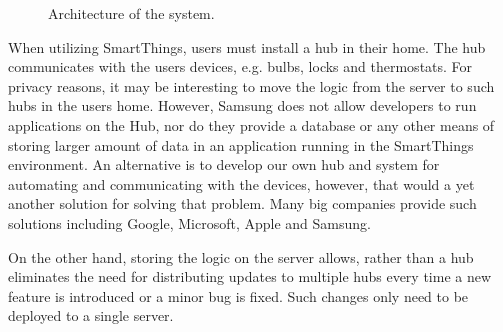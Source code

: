 \begin{figure}[h]
  \centering
  \caption{Architecture of the system.}
  \label{fig:architecture}
\end{figure}

When utilizing SmartThings, users must install a hub in their home. 
The hub communicates with the users devices, e.g. bulbs, locks and thermostats. 
For privacy reasons, it may be interesting to move the logic from the server to such hubs in the users home. 
However, Samsung does not allow developers to run applications on the Hub, 
nor do they provide a database or any other means of storing larger amount of data in an application running in the SmartThings environment.
An alternative is to develop our own hub and system for automating and communicating with the devices, 
however, that would a yet another solution for solving that problem. 
Many big companies provide such solutions including Google, Microsoft, Apple and Samsung.

On the other hand, storing the logic on the server allows, 
rather than a hub eliminates the need for distributing updates to multiple hubs every time a new feature is introduced or a minor bug is fixed. 
Such changes only need to be deployed to a single server.

